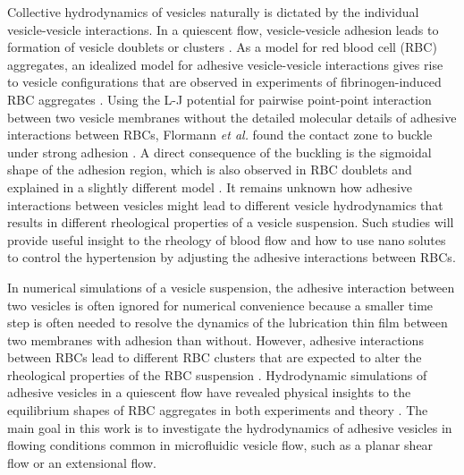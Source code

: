 \documentclass[prf,superscriptaddress,showpacs]{revtex4-1}
\begin{document}
%
%
Collective hydrodynamics of vesicles naturally is dictated by the individual
vesicle-vesicle interactions.  
In a quiescent flow,
vesicle-vesicle adhesion leads to formation of vesicle doublets \cite{ZiherlSvetina2007_PNAS} or clusters \cite{SvetinaZiherl2008_Bioelectrochemistry,FlormannAouane2017_SciReports}.
As a model for red blood cell (RBC) aggregates, an idealized model for adhesive vesicle-vesicle interactions gives rise to 
vesicle configurations that are observed in experiments of fibrinogen-induced RBC aggregates \cite{SvetinaZiherl2008_Bioelectrochemistry,FlormannAouane2017_SciReports}. 
Using the L-J potential for pairwise point-point interaction between two vesicle membranes without the detailed molecular details of
adhesive interactions between RBCs, Flormann {\it et al.} found the contact zone to buckle under strong adhesion \cite{FlormannAouane2017_SciReports}. 
A direct consequence of the buckling is the
sigmoidal shape of the adhesion region, which is also observed in RBC doublets and explained in a slightly different model \cite{ZiherlSvetina2007_PNAS}. 
It remains unknown how adhesive interactions between vesicles might lead to different vesicle hydrodynamics that results in
different rheological properties of a vesicle suspension. Such studies will provide useful insight to the rheology of blood flow and how to use nano solutes to control the hypertension
by adjusting the adhesive interactions between RBCs.
%

In numerical simulations of  a vesicle suspension, the adhesive interaction between two vesicles is often ignored for numerical convenience
because a smaller time step is often needed to resolve the dynamics of the lubrication thin film between two membranes with adhesion than without.
However, adhesive interactions  between RBCs lead to different RBC clusters that are expected to alter the rheological properties of the RBC suspension \cite{NeuMeiselman2002_BiophysJ,SvetinaZiherl2008_Bioelectrochemistry}.
Hydrodynamic simulations of adhesive vesicles in a quiescent flow have revealed physical insights to the equilibrium shapes of RBC aggregates in both experiments 
\cite{FlormannAouane2017_SciReports} and theory \cite{ZiherlSvetina2007_PNAS}. The main goal in this work is to investigate the hydrodynamics of adhesive vesicles in flowing
conditions common in microfluidic vesicle flow, such as a planar shear flow or an extensional flow.
\end{document}
